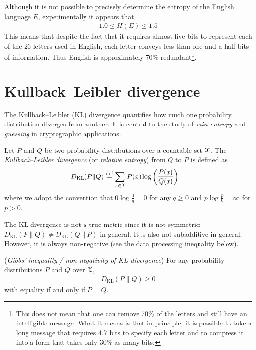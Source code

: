\documentclass[a4paper, 12pt]{book} %
\begin{document}
Although it is not possible to precisely determine the entropy of the English language $E$, experimentally it appears that
\begin{align}
    1.0 \leq H(E) \leq 1.5
\end{align}
This means that despite the fact that it requires almost five bits to represent each of the 26 letters used in English, each letter conveys less than one and a half bits of information. Thus English is approximately 70\% redundant\footnote{This does not mean that one can remove 70\% of the letters and still have an intelligible message. What it means is that in principle, it is possible to take a long message that requires 4.7 bits to specify each letter and to compress it into a form that takes only 30\% as many bits.}.
\section{Kullback--Leibler divergence}

The Kullback--Leibler (KL) divergence quantifies how much one probability
distribution diverges from another. It is central to the study of
\emph{min-entropy} and \emph{guessing} in cryptographic applications.

\begin{definition}
    Let $P$ and $Q$ be two probability distributions over a countable set $\EuScript{X}$. The \emph{Kullback--Leibler divergence} (or \emph{relative entropy}) from $Q$ to $P$ is defined as
    \begin{align}
        D_{\mathrm{KL}}(P \| Q) &\overset{\text{def}}{=} \sum_{x \in \EuScript{X}} P(x) \log\left( \frac{P(x)}{Q(x)} \right)
    \end{align}
    where we adopt the convention that $0 \log \frac{0}{q} = 0$ for any $q \geq 0$ and $p \log \frac{p}{0} = \infty$ for $p > 0$.
\end{definition}

\begin{remark}
    The KL divergence is not a true metric since it is not symmetric: $D_{\mathrm{KL}}(P \| Q) \neq D_{\mathrm{KL}}(Q \| P)$ in general. It is also not subadditive in general. However, it is always non-negative (see the data processing inequality below).
\end{remark}

\begin{theorem}
    (\emph{Gibbs' inequality / non-negativity of KL divergence}) For any probability distributions $P$ and $Q$ over $\EuScript{X}$,
    \begin{align}
        D_{\mathrm{KL}}(P \| Q) \geq 0
    \end{align}
    with equality if and only if $P = Q$.
\end{theorem}
\end{document}
